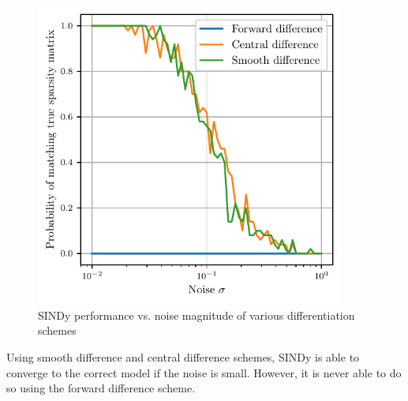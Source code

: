 \documentclass[11pt]{article}
\begin{document}
\begin{figure}[H]
    \centering
    \includegraphics[width=4in]{p3fig1.pdf}
    \caption{SINDy performance vs. noise magnitude of various differentiation schemes}
    \label{p3cfig1}
\end{figure}

Using smooth difference and central difference schemes, SINDy is able to converge to the correct model if the noise is small. However, it is never able to do so using the forward difference scheme.



\section{}


\subsection{} %
\end{document}
